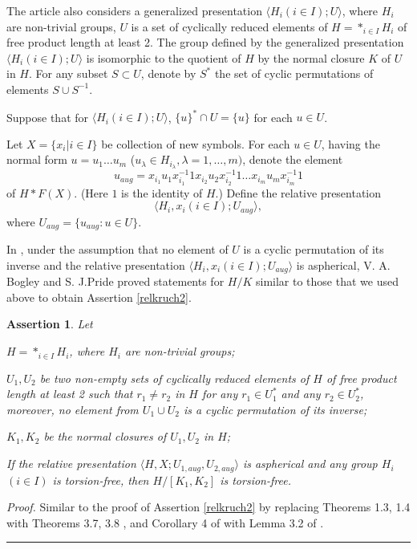 \documentclass[12pt,reqno]{amsart}
\def\edvo{\rule {6pt}{6pt}}
\newtheorem{cl}{Assertion}
\begin{document}
\vspace{3mm}

The article \cite{BogleyPride} also considers a generalized presentation
 $\langle H_i (i\in I);U \rangle$, where $H_i$ are non-trivial groups, $U$ is a set of cyclically reduced elements of $H=\ast_{i\in I}H_i$ of free product length at least 2. The group defined by the generalized presentation $\langle H_i (i\in I);U \rangle$ is isomorphic to the quotient of $H$ by the normal closure $K$
of $U$ in $H$. For any subset $S\subset U$, denote by $S^{*}$ the set of cyclic permutations of elements $S\cup S^{-1}$.

Suppose that for $\langle H_i (i\in I);U \rangle$, $\{u\}^{*}\cap U=\{u\}$ for each $u\in U$.


Let $X=\{x_i|i\in I\}$ be collection of new symbols. For each $u\in U$, having the normal form $u=u_1\ldots u_m$ ($u_{\lambda}\in H_{i_{\lambda}}, \lambda=1,\ldots,m)$, denote the element
$$u_{aug}=x_{i_1}u_1x_{i_1}^{-1}1x_{i_2}u_2x_{i_2}^{-1}1\ldots x_{i_m}u_mx_{i_m}^{-1}1$$
of $H\ast F(X)$. (Here $1$ is the identity of $H$.) Define the relative presentation
$$\langle H_i, x_i (i\in I);U_{aug} \rangle,$$
where $U_{aug}=\{u_{aug}:u\in U\}$.

In \cite{BogleyPride}, under the assumption that
no element of $U$ is a cyclic permutation of its inverse and the relative presentation $\langle H_i, x_i (i\in I);U_{aug} \rangle$ is aspherical, V. A. Bogley and S. J.Pride proved statements for $H/K$ similar to those that we used above to obtain Assertion \ref{relkruch2}.

\begin{cl}\label{relrelkruch2} Let

$H=*_{i\in I}H_i$, where $H_i$ are non-trivial groups;

$U_1, U_2$ be two non-empty sets of cyclically reduced elements of $H$ of free product length at least 2 such that $r_1\neq r_2$ in $H$ for any $r_1\in U_1^{*}$ and any $r_2\in
U_2^{*}$, moreover, no element from $U_1\cup U_2$ is a cyclic permutation of its inverse;

$K_1,K_2$ be the normal closures of $U_1, U_2$ in $H$;




If the relative presentation $ \langle H,X;U_{1,aug}, U_{2,aug}\rangle$ is aspherical and any group $H_i$ $(i\in I)$ is torsion-free, then
 $H/[K_1,K_2]$ is torsion-free.
  \end{cl}
  {\it Proof.}  Similar to the proof of Assertion \ref{relkruch2} by replacing Theorems 1.3, 1.4 \cite{BogleyPride} with Theorems 3.7, 3.8 \cite{BogleyPride}, and Corollary 4 of \cite{BogleyPride} with Lemma 3.2 of \cite{BogleyPride}.\edvo
\end{document}
